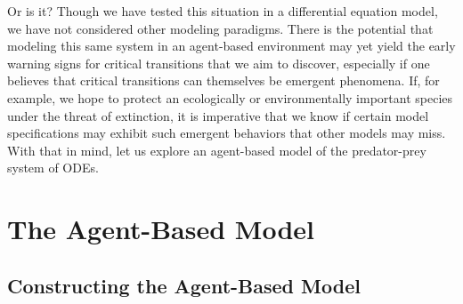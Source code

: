 \documentclass[12pt]{article}
\begin{document}
Or is it? Though we have tested this situation in a differential equation model, we have not considered other modeling paradigms. There is the potential that modeling this same system in an agent-based environment may yet yield the early warning signs for critical transitions that we aim to discover, especially if one believes that critical transitions can themselves be emergent phenomena. If, for example, we hope to protect an ecologically or environmentally important species under the threat of extinction, it is imperative that we know if certain model specifications may exhibit such emergent behaviors that other models may miss. With that in mind, let us explore an agent-based model of the predator-prey system of ODEs.


\section{The Agent-Based Model}

\subsection{Constructing the Agent-Based Model}
\end{document}
